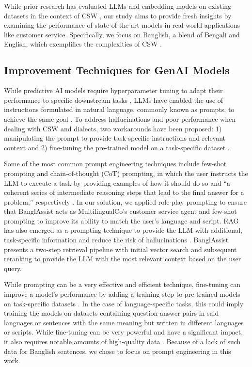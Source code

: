 \documentclass[sigconf]{acmart}
\begin{document}
While prior research has evaluated LLMs and embedding models on existing datasets in the context of CSW \cite{winata2021multilingual,zhang2023multilingual}, our study aims to provide fresh insights by examining the performance of state-of-the-art models in real-world applications like customer service. Specifically, we focus on Banglish, a blend of Bengali and English, which exemplifies the complexities of CSW \cite{mostafa2012english}.

\subsection{Improvement Techniques for GenAI Models}

While predictive AI models require hyperparameter tuning to adapt their performance to specific downstream tasks \cite{herath2024design}, LLMs have enabled the use of instructions formulated in natural language, commonly known as prompts, to achieve the same goal \cite{trad2024prompt,chen2023unleashing}. To address hallucinations and poor performance when dealing with CSW and dialects, two workarounds have been proposed: 1) manipulating the prompt to provide task-specific instructions and relevant context \cite{sahoo2024systematic, lewis2020retrieval} and 2) fine-tuning the pre-trained model on a task-specific dataset \cite{ziegler2019fine}.

Some of the most common prompt engineering techniques include few-shot prompting and chain-of-thought (CoT) prompting, in which the user instructs the LLM to execute a task by providing examples of how it should do so and “a coherent series of intermediate reasoning steps that lead to the final answer for a problem,” respectively \cite{wei2022chain}. In our solution, we applied role-play prompting \cite{kong2023better} to ensure that BanglAssist acts as MultilingualCo's customer service agent and few-shot prompting to improve its ability to match the user's language and script. RAG has also emerged as a prompting technique to provide the LLM with additional, task-specific information and reduce the risk of hallucinations \cite{lewis2020retrieval}. BanglAssist presents a two-step retrieval pipeline with initial vector search and subsequent reranking to provide the LLM with the most relevant context based on the user query.

While prompting can be a very effective and efficient technique, fine-tuning can improve a model’s performance by adding a training step to pre-trained models on task-specific datasets \cite{ziegler2019fine}. In the case of language-specific tasks, this could imply training the models on datasets containing question-answer pairs in said languages or sentences with the same meaning but written in different languages or scripts. While fine-tuning can be very powerful and have a significant impact, it also requires notable amounts of high-quality data \cite{vieira2024much}. Because of a lack of such data for Banglish sentences, we chose to focus on prompt engineering in this work.
\end{document}
